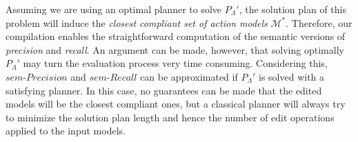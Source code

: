 Assuming we are using an optimal planner to solve $P_{\Lambda}'$, the solution plan of this problem will induce the \emph{closest compliant set of action models} $\mathcal{M^*}$. Therefore, our compilation enables the straightforward computation of the semantic versions of \emph{precision} and \emph{recall}. An argument can be made, however, that solving optimally $P_{\Lambda}'$ may turn the evaluation process very time consuming. Considering this, $sem\text{-}Precision$ and $sem\text{-}Recall$ can be approximated if $P_{\Lambda}'$ is solved with a satisfying planner. In this case, no guarantees can be made that the edited models will be the closest compliant ones, but a classical planner will always try to minimize the solution plan length and hence the number of edit operations applied to the input models.














